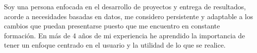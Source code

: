 \documentclass[9pt]{developercv} %
\begin{document}

\begin{minipage}[t]{0.4\textwidth} %
	\vspace{-\baselineskip} %
	
	Soy una persona enfocada en el desarrollo de proyectos y entrega de resultados, acorde a necesidades basadas en datos, me considero persistente y adaptable a los cambios que puedan presentarse puesto que me encuentro en constante formación. En más de 4 años de mi experiencia he aprendido la importancia de tener un enfoque centrado en el usuario y la utilidad de lo que se realice. \\ %
\end{minipage}
\hfill %
\begin{minipage}[t]{0.5\textwidth} %
	\vspace{-\baselineskip} %
	\begin{barchart}{5.5}
	\end{barchart}
\end{minipage}

\begin{center}
\end{center}


\end{document}
